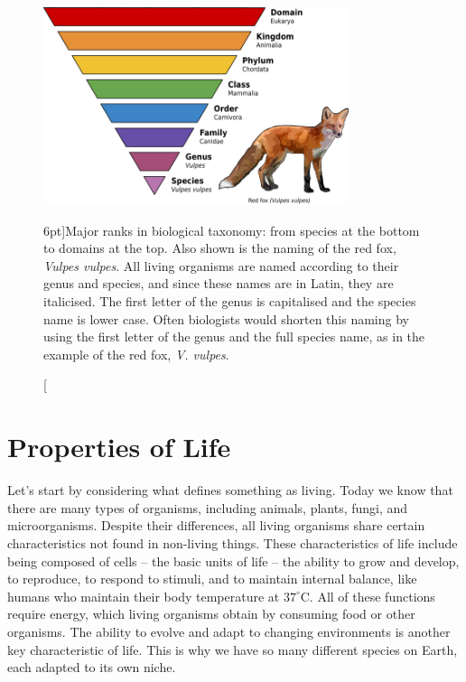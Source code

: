 \begin{figure}
  \includegraphics[width=0.8\textwidth]{figs/molbiol/taxonomy.png}
  \caption[][6pt]{Major ranks in biological taxonomy: from species at the bottom to domains at the top. Also shown is the naming of the red fox, \textit{Vulpes vulpes}. All living organisms are named according to their genus and species, and since these names are in Latin, they are italicised. The first letter of the genus is capitalised and the species name is lower case. Often biologists would shorten this naming by using the first letter of the genus and the full species name, as in the example of the red fox, \textit{V. vulpes}.}
  \label{fig:taxonomy}
\end{figure}


\section{Properties of Life}

Let's start by considering what defines something as living. Today we know that there are many types of organisms, including animals, plants, fungi, and microorganisms. Despite their differences, all living organisms share certain characteristics not found in non-living things. These characteristics of life include being composed of cells -- the basic units of life -- the ability to grow and develop, to reproduce, to respond to stimuli, and to maintain internal balance, like humans who maintain their body temperature at \(37^\circ\mathrm{C}\). All of these functions require energy, which living organisms obtain by consuming food or other organisms. The ability to evolve and adapt to changing environments is another key characteristic of life. This is why we have so many different species on Earth, each adapted to its own niche.

